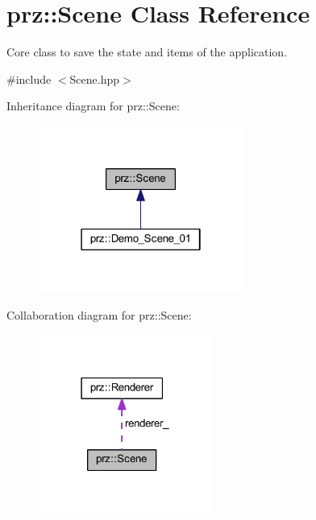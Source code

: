 \hypertarget{classprz_1_1_scene}{}\section{prz\+::Scene Class Reference}
\label{classprz_1_1_scene}


Core class to save the state and items of the application.  




{\ttfamily \#include $<$Scene.\+hpp$>$}



Inheritance diagram for prz\+::Scene\+:
\nopagebreak
\begin{figure}[H]
\begin{center}
\leavevmode
\includegraphics[width=190pt]{classprz_1_1_scene__inherit__graph}
\end{center}
\end{figure}


Collaboration diagram for prz\+::Scene\+:
\nopagebreak
\begin{figure}[H]
\begin{center}
\leavevmode
\includegraphics[width=162pt]{classprz_1_1_scene__coll__graph}
\end{center}
\end{figure}
